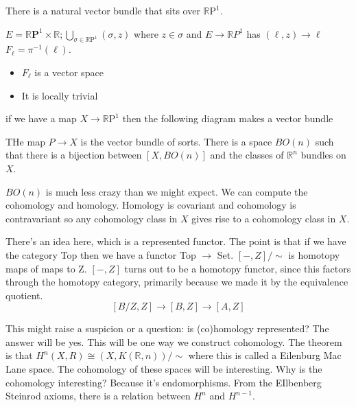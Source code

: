 \documentclass[12pt]{article}
\theoremstyle{definition}
\begin{document}
	There is a natural vector bundle that sits over $\mathbb{R}\text{P}^1$. 
	\begin{center}
	\end{center}
	$E=\mathbb{R}\textbf{P}^1\times \mathbb{R};  \bigcup_{\sigma\in \mathbb{R}\text{P}^1}(\sigma,z)$ where $z\in \sigma$ and $E\to \mathbb{R} P^1$ has $(\ell,z)\to \ell$
	$F_\ell=\pi^{-1}(\ell)$. \begin{itemize}
		\item $F_\ell$ is a vector space
		\item It is locally trivial 
	\end{itemize}
	if we have a map $X\to \mathbb{R} \text{P}^1$ then the following diagram makes a vector bundle
	\begin{center}
	\end{center}
	THe map $P\to X$ is the vector bundle of sorts.
	There is a space $BO(n)$ such that there is a bijection between $[X,BO(n)]$ and the classes of $\mathbb{R}^n$ bundles on $X$. 
	
	$BO(n)$ is much less crazy than we might expect. We can compute the cohomology and homology. Homology is covariant and cohomology is contravariant so any cohomology class in $X$ gives rise to a cohomology class in $X$.  
	
	There's an idea here, which is a represented functor. The point is that if we have the category \textsf{Top} then we have a functor \textsf{Top} $\to$ \textsf{Set}.  $[-,Z]/\sim$ is homotopy maps of maps to Z. $[-,Z]$ turns out to be a homotopy functor, since this factors through the homotopy category, primarily because we made it by the equivalence quotient. 
	\[
	[B/Z,Z]\to [B,Z]\to [A,Z]
	\]
	
	This might raise a suspicion or a question: is (co)homology represented? The answer will be yes. This will be one way we construct cohomology. The theorem is that $H^n(X,R)\cong (X, K(\mathbb{R}, n))/\sim$ where this is called a Eilenburg Mac Lane space.  The cohomology of these spaces will be interesting. Why is the cohomology interesting? Because it's endomorphisms. From the EIlbenberg Steinrod axioms, there is a relation between $H^n$ and $H^{n-1}$. 
	
\end{document}

